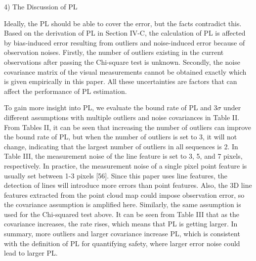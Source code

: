 \documentclass[10pt, letterpaper]{article}
\begin{document}
\begin{multicols*}{2}
4) The Discussion of PL


Ideally, the PL should be able to cover the error, but the facts
contradict this. Based on the derivation of PL in Section IV-C,
the calculation of PL is affected by bias-induced error resulting
from outliers and noise-induced error because of observation
noises. Firstly, the number of outliers existing in the current
observations after passing the Chi-square test is unknown.
Secondly, the noise covariance matrix of the visual
measurements cannot be obtained exactly which is given
empirically in this paper. All these uncertainties are factors that
can affect the performance of PL estimation.


To gain more insight into PL, we evaluate the bound rate of
PL and 3$\sigma$ under different assumptions with multiple outliers
and noise covariances in Table II. From Tables II, it can be seen
that increasing the number of outliers can improve the bound
rate of PL, but when the number of outliers is set to 3, it will
not change, indicating that the largest number of outliers in all
sequences is 2. In Table III, the measurement noise of the line
feature is set to 3, 5, and 7 pixels, respectively. In practice, the
measurement noise of a single pixel point feature is usually set
between 1-3 pixels [56]. Since this paper uses line features, the
detection of lines will introduce more errors than point features.
Also, the 3D line features extracted from the point cloud map
could impose observation error, so the covariance assumption
is amplified here. Similarly, the same assumption is used for the
Chi-squared test above. It can be seen from Table III that as the
covariance increases, the rate rises, which means that PL is
getting larger. In summary, more outliers and larger covariance
increase PL, which is consistent with the definition of PL for
quantifying safety, where larger error noise could lead to larger
PL.


\end{multicols*}
\end{document}
